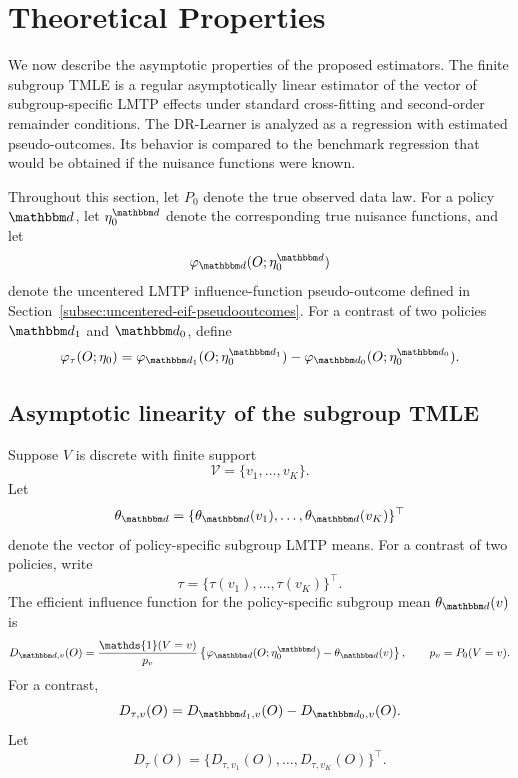 \documentclass[11pt]{article}
\begin{document}
\section{Theoretical Properties}
\label{sec:theory}

We now describe the asymptotic properties of the proposed estimators. 
The finite subgroup TMLE is a regular asymptotically linear estimator of the
vector of subgroup-specific LMTP effects under standard cross-fitting and
second-order remainder conditions. The DR-Learner is analyzed as a regression
with estimated pseudo-outcomes. Its behavior is compared to the benchmark
regression that would be obtained if the nuisance functions were known.

Throughout this section, let \(P_0\) denote the true observed data law. For a
policy \(\mathbbm d\), let \(\eta_0^{\mathbbm d}\) denote the corresponding true
nuisance functions, and let
\[
  \varphi_{\mathbbm d}(O;\eta_0^{\mathbbm d})
\]
denote the uncentered LMTP influence-function pseudo-outcome defined in
Section~\ref{subsec:uncentered-eif-pseudooutcomes}. For a contrast of two
policies \(\mathbbm d_1\) and \(\mathbbm d_0\), define
\[
  \varphi_{\tau}(O;\eta_0)
  =
  \varphi_{\mathbbm d_1}(O;\eta_0^{\mathbbm d_1})
  -
  \varphi_{\mathbbm d_0}(O;\eta_0^{\mathbbm d_0}).
\]

\subsection{Asymptotic linearity of the subgroup TMLE}
\label{subsec:theory-subgroup-tmle}

Suppose \(V\) is discrete with finite support
\[
  \mathcal V = \{v_1,\ldots,v_K\}.
\]
Let
\[
  \theta_{\mathbbm d}
  =
  \{\theta_{\mathbbm d}(v_1),\ldots,\theta_{\mathbbm d}(v_K)\}^\top
\]
denote the vector of policy-specific subgroup LMTP means. For a contrast of two
policies, write
\[
  \tau
  =
  \{\tau(v_1),\ldots,\tau(v_K)\}^\top.
\]
The efficient influence function for the policy-specific subgroup mean
\(\theta_{\mathbbm d}(v)\) is
\[
  D_{\mathbbm d,v}(O)
  =
  \frac{\mathds{1}(V=v)}{p_v}
  \left\{
    \varphi_{\mathbbm d}(O;\eta_0^{\mathbbm d})
    -
    \theta_{\mathbbm d}(v)
  \right\},
  \qquad
  p_v = P_0(V=v).
\]
For a contrast,
\[
  D_{\tau,v}(O)
  =
  D_{\mathbbm d_1,v}(O)
  -
  D_{\mathbbm d_0,v}(O).
\]
Let
\[
  D_\tau(O)
  =
  \{D_{\tau,v_1}(O),\ldots,D_{\tau,v_K}(O)\}^\top.
\]
\end{document}
